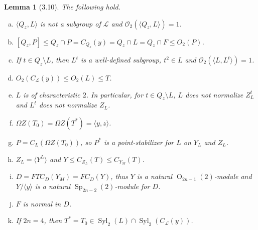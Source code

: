 \documentclass{amsart}
\numberwithin{equation}{section}
\newtheorem{lemma}[equation]{Lemma}
\theoremstyle{definition}
\theoremstyle{subresult}
\theoremstyle{caseresult}
\renewcommand{\L}{\mathcal{L}}
\newcommand{\coll}{\mathcal{O}}
\newcommand{\Syl}{\operatorname{Syl}}
\newcommand{\Sp}{\operatorname{Sp}}
\renewcommand{\O}{\operatorname{O}}
\newcommand{\norm}{\trianglelefteq}
\newcommand{\<}{\langle}
\renewcommand{\>}{\rangle}
\begin{document}
\begin{lemma}[3.10]\label{lemma3.10}
	The following hold.
	\begin{enumerate}[(a)]
		\item $\<Q_z,L \>$ is not a subgroup of $\L$ and $\coll_2(\<Q_z, L\>) = 1$.
		\item $[Q_z,P] \le Q_z \cap P = C_{Q_z}(y) = Q_z \cap L = Q_z \cap F \le O_2(P)$.
		\item If $t \in Q_z \setminus L$, then $L^t$ is a well-defined subgroup, $t^2 \in L$ and $\coll_2(\<L, L^t \>)=1$.
		\item $O_2(C_\L(y)) \le O_2(L) \le T$.
		\item $L$ is of characteristic $2$. In particular, for $t \in Q_z \setminus L$, $L$ does not normalize $Z_L^t$ and $L^t$ does not normalize $Z_L$.
		\item $\Omega Z(T_0) = \Omega Z(T^*) = \<y, z \>$.
		\item $P =C_L(\Omega Z(T_0))$, so $P^*$ is a point-stabilizer for $L$ on $Y_L$ and $Z_L$.
		\item $Z_L = \<Y^L\>$ and $Y \le C_{Z_L}(T) \le C_{Y_M}(T)$.
		\item $D=FTC_D(Y_M)=FC_D(Y)$, thus $Y$ is a natural $\O_{2n-1}(2)$-module and $Y/\<y\>$ is a natural $\Sp_{2n-2}(2)$-module for $D$.
		\item $F$ is normal in $D$.
		\item If $2n=4$, then $T^* =T_0 \in \Syl_2(L) \cap \Syl_2(C_\L(y))$.
	\end{enumerate}
\end{lemma}
\end{document}
